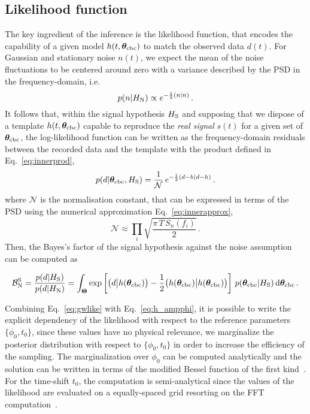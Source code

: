 \documentclass[prd,aps,twocolumn,a4paper,showkeys,nofootinbib,floatfix]{revtex4-1}
\newcommand{\be}{\begin{equation}}
\newcommand{\ee}{\end{equation}}
\def\B{\mathcal{B}}
\def\params{\boldsymbol{\theta}}
\def\paramspace{\boldsymbol{\Theta}}
\def\d{\text{d}}
\begin{document}
\subsection{Likelihood function} 
\label{sec:like}

The key ingredient of the inference is the likelihood function,
that encodes the capability of a given model $h(t,\params_{\rm cbc})$ to match the observed data $d(t)$. 
For Gaussian and stationary noise $n(t)$, 
we expect the mean of the noise fluctuations to be centered around 
zero with a variance described by the PSD in the frequency-domain,
i.e.
\be
\label{eq:noiseprob}
p(n|H_{\rm N}) \propto e^{-\frac{1}{2} (n|n)}\,.
\ee
It follows that, within the signal hypothesis $H_{\rm S}$
and supposing that we dispose of a template $h(t,\params_{\rm cbc})$ 
capable to reproduce the {\it real signal} $s(t)$ for a given set of $\params_{\rm cbc}$,
the log-likelihood function can be written 
as the frequency-domain residuals 
between the recorded data and the template
with the product defined in Eq.~\eqref{eq:innerprod}, 
\be
\label{eq:gwlike}
p(d|\params_{\rm cbc},H_{\rm S}) = \frac{1}{\mathcal{N}}\,  e^{-\frac{1}{2}(d-h|d-h)}\,.
\ee
where $\mathcal{N}$ is the normalisation constant,
that can be expressed in terms of the PSD
using the numerical approximation Eq.~\eqref{eq:innerapprox},
\be
\label{eq:gwlike_norm}
\mathcal{N} \approx  \prod_{i} \sqrt{ \frac{\pi \,T\, S_n(f_i)}{2}}\,.
\ee
Then, the Bayes's factor of the signal hypothesis against
the noise assumption can be computed as
\begin{widetext}
\be
\label{eq:B_signal}
\B^{\rm S}_{\rm N} = \frac{p(d|H_{\rm S})}{p(d|H_{\rm N})}=\int_{\paramspace} \exp\left[\big(d\big|h(\params_{\rm cbc})\big)-\frac{1}{2}\big(h(\params_{\rm cbc})\big|h(\params_{\rm cbc})\big)\right]\, p(\params_{\rm cbc}|H_{\rm S})\,\d\params_{\rm cbc}\,.
\ee
\end{widetext}
	
Combining Eq.~\eqref{eq:gwlike} with Eq.~\eqref{eq:h_ampphi},
it is possible to write the explicit 
dependency of the likelihood with respect to the reference parameters $\{\phi_0,t_0\}$,
since these
  values have no physical relevance, we marginalize the posterior
distribution with respect to $\{\phi_0,t_0\}$ in order to increase the
efficiency of the sampling.
The marginalization over $\phi_0$ can be computed analytically
and the solution can be written in terms of the 
modified Bessel function of the first kind~\cite{margphi}.
For the time-shift $t_0$, the computation is semi-analytical
since the values of the likelihood are evaluated on a equally-spaced grid
resorting on the FFT computation~\cite{margtime}.
\end{document}
